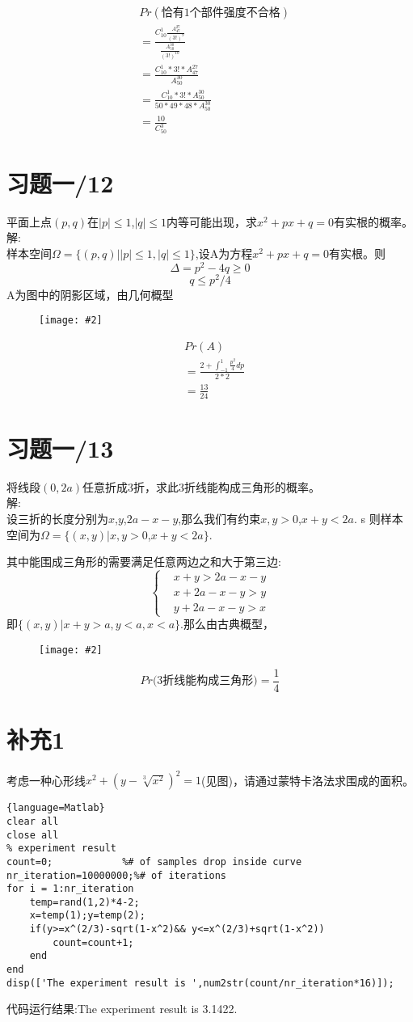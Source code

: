 \documentclass[a4paper]{ctexart}
\newcommand{\fignocaption}[2]{
	\begin{figure}[htp]
		\centering
		\texttt{[image: \#2]}
	\end{figure}
}
\begin{document}
\begin{align*}
&Pr(\text{恰有1个部件强度不合格})\\
&=\frac{C_{10}^1 \frac{A_{47}^{27}}{(3!)^9}}{\frac{A_{50}^{30}}{(3!)^{10}}}\\
&=\frac{C_{10}^{1}*3!*A_{47}^{27}}{A_{50}^{30}}\\
&=\frac{C_{10}^1*3!*A_{50}^{30}}{50*49*48*A_{50}^{30}}\\
&=\frac{10}{C_{50}^3}
\end{align*}

\section{习题一/12}
平面上点$(p,q)$在$|p|\le1$,$|q|\le1$内等可能出现，求$x^2+px+q=0$有实根的概率。\\

\noindent 解:\\
样本空间$\Omega=\{(p,q)||p|\le1,|q|\le1\}$,设A为方程$x^2+px+q=0$有实根。则\\
\[
\Delta=p^2-4q\ge0
\]
\[
q\le p^2/4
\]
A为图中的阴影区域，由几何概型\\

\fignocaption{width=0.3\textwidth}{12.jpg}

\begin{align*}
&Pr(A)\\
&=\frac{2+\int_{-1}^{1}\frac{p^2}{4}dp}{2*2}\\
&=\frac{13}{24}
\end{align*}

\section{习题一/13}
将线段$(0,2a)$任意折成3折，求此3折线能构成三角形的概率。\\
\noindent 解:\\
设三折的长度分别为$x$,$y$,$2a-x-y$,那么我们有约束$x,y>0$,$x+y<2a$.
s
则样本空间为$\Omega=\{(x,y)|x,y>0$,$x+y<2a\}$.

其中能围成三角形的需要满足任意两边之和大于第三边:
\[
\begin{cases}
&x+y>2a-x-y\\
&x+2a-x-y>y\\
&y+2a-x-y>x
\end{cases}
\]
即$\{(x,y)|x+y>a,y<a,x<a\}$.那么由古典概型，
\fignocaption{width=0.3\textwidth}{13.jpg}
\[
Pr(\text{3折线能构成三角形)}=\frac{1}{4}
\]

\section{补充1}
考虑一种心形线$x^2+(y-\sqrt[3]{x^2})^2=1$(见图)，请通过蒙特卡洛法求围成的面积。
\begin{lstlisting}{language=Matlab}
clear all
close all
% experiment result
count=0;            %# of samples drop inside curve
nr_iteration=10000000;%# of iterations
for i = 1:nr_iteration
	temp=rand(1,2)*4-2;
	x=temp(1);y=temp(2);
	if(y>=x^(2/3)-sqrt(1-x^2)&& y<=x^(2/3)+sqrt(1-x^2))
		count=count+1;
	end
end
disp(['The experiment result is ',num2str(count/nr_iteration*16)]);
\end{lstlisting}
代码运行结果:The experiment result is 3.1422.
\end{document}
